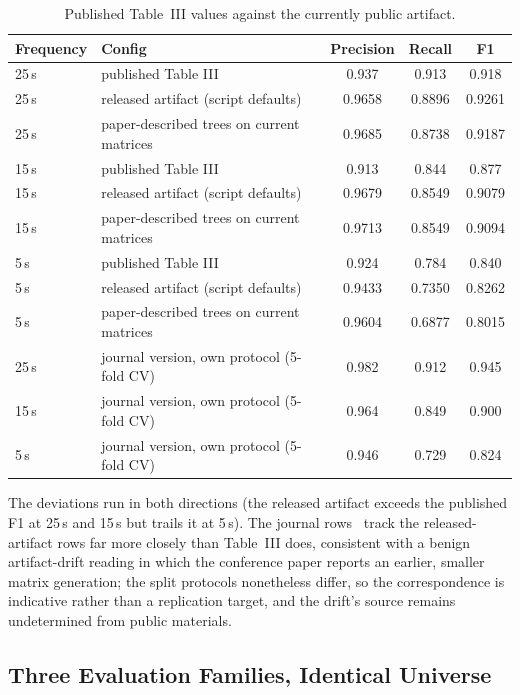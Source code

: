 \documentclass[runningheads]{llncs}
\begin{document}
\begin{table}[t]
\centering
\caption{Published Table~III values against the currently public
artifact.}
\label{tab:tableiii}
\footnotesize
\setlength{\tabcolsep}{4pt}
\begin{tabular}{llccc}
\toprule
Frequency & Config & Precision & Recall & F1 \\
\midrule
25\,s & published Table III & 0.937 & 0.913 & 0.918 \\
25\,s & released artifact (script defaults) & 0.9658 & 0.8896 & 0.9261 \\
25\,s & paper-described trees on current matrices & 0.9685 & 0.8738 & 0.9187 \\
15\,s & published Table III & 0.913 & 0.844 & 0.877 \\
15\,s & released artifact (script defaults) & 0.9679 & 0.8549 & 0.9079 \\
15\,s & paper-described trees on current matrices & 0.9713 & 0.8549 & 0.9094 \\
5\,s  & published Table III & 0.924 & 0.784 & 0.840 \\
5\,s  & released artifact (script defaults) & 0.9433 & 0.7350 & 0.8262 \\
5\,s  & paper-described trees on current matrices & 0.9604 & 0.6877 & 0.8015 \\
25\,s & journal version, own protocol (5-fold CV)~\cite{LaMorgia2023} & 0.982 & 0.912 & 0.945 \\
15\,s & journal version, own protocol (5-fold CV)~\cite{LaMorgia2023} & 0.964 & 0.849 & 0.900 \\
5\,s  & journal version, own protocol (5-fold CV)~\cite{LaMorgia2023} & 0.946 & 0.729 & 0.824 \\
\bottomrule
\end{tabular}
\end{table}

The deviations run in both directions (the released artifact exceeds
the published F1 at 25\,s and 15\,s but trails it at 5\,s). The journal
rows~\cite{LaMorgia2023} track the released-artifact rows far more
closely than Table~III does, consistent with a benign artifact-drift
reading in which the conference paper reports an earlier, smaller
matrix generation; the split protocols nonetheless differ, so the
correspondence is indicative rather than a replication target, and the
drift's source remains undetermined from public materials.

\subsection{Three Evaluation Families, Identical
Universe}\label{sec:threefam}
\end{document}
